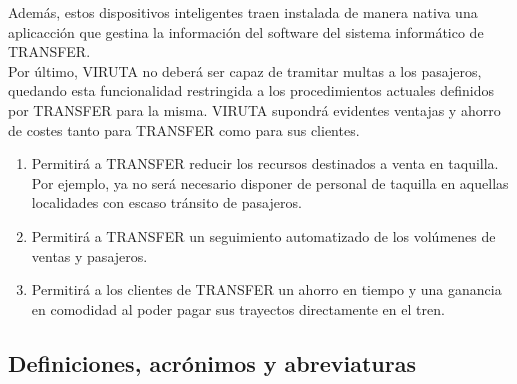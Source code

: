 Además, estos dispositivos inteligentes traen instalada de manera nativa una aplicacción que gestina la información del software del sistema informático de TRANSFER.\\


Por último, VIRUTA no deberá ser capaz de tramitar multas a los pasajeros, quedando esta funcionalidad restringida a los procedimientos actuales definidos por TRANSFER para la misma.
VIRUTA supondrá evidentes ventajas y ahorro de costes tanto para TRANSFER como para sus clientes.\\

\begin{enumerate}
\item Permitirá a TRANSFER reducir los recursos destinados a venta en taquilla. Por ejemplo, ya no será necesario disponer de personal de taquilla en aquellas localidades con escaso tránsito de pasajeros.
\item Permitirá a TRANSFER un seguimiento automatizado de los volúmenes de ventas y pasajeros.
\item Permitirá a los clientes de TRANSFER un ahorro en tiempo y una ganancia en comodidad al poder pagar sus trayectos directamente en el tren.
\end{enumerate}

\subsection{Definiciones, acrónimos y abreviaturas}

